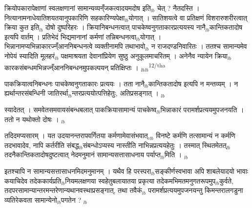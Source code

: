 \documentclass[article,12pt,a4paper]{memoir}%
\newcounter{parCount}
\begin{document}
	  \pstart \leavevmode%
	क्रियोपकारापेक्षाणां स्वलक्षणानां सामान्यव्यन्ँजकत्वादयमदोष इति{\tiny $_{lb}$} चेत् ? नैतदस्ति । नित्यानामनाधेयातिशयतयानुपकारिणि सहकारिण्यपेक्षा{\tiny $_{lb}$}योगात् । सातिशयत्वे वा प्रतिक्षणं विशरारुशरीरत्वात् क्रिया कुत इति{\tiny $_{lb}$} दोषो दुष्परिहरः । क्रियानिबन्धनत्वात् पाचकेष्वनुगताकारप्रत्ययस्य नानै{\tiny $_{lb}$}कान्तिकतादोष इत्यपि वार्तम् । प्रतिभेदं भिद्यमानानां कर्मणां तन्निबन्धनत्वा{\tiny $_{lb}$}योगात् । भिन्नानामप्यभिन्नाकारज्न्ँआननिबन्धनत्वे व्यक्तीनामपि तथाभावो{\tiny $_{lb}$} न राजदण्डनिवारितः । ततश्च सामान्यमेव नोपेयं स्यादिति मूलहरं{\tiny $_{lb}$} पक्षमाश्रयता देवानांप्रियेण सुष्ठु अनुकूलमाचरितम् । अनेनैव न्यायेन क्रिया{\tiny $_{lb}$}कारकसंबन्धमभिन्नज्न्ँआननिबन्धनमुपकल्पयन् प्रतिक्षिप्तः ।
	{}
	\pend%
      {\tiny $_{lb}$}{\tiny $_{lb}$}\textsuperscript{\textenglish{12/tha}}

	  \pstart \leavevmode%
	पाकक्रियात्वनिबन्धनः पाचकेष्वनुगताकारः प्रत्ययः । तता नानै{\tiny $_{lb}$}कान्तिकतादोष इत्यपि न मन्तव्यम् । न ह्यर्थान्तरसंबन्धिनी जातिरर्था{\tiny $_{lb}$}न्तरप्रत्ययोत्पत्तिहेतुः, अतिप्रसङ्गात् ।
	{}
	\pend%
      {\tiny $_{lb}$}

	  \pstart \leavevmode%
	स्यादेतत् । समवेतसमवायसंबन्धबलात् पाकक्रियासामान्यं पाचकेष्व{\tiny $_{lb}$}भिन्नाकारं परामर्शप्रत्ययमुपजनयति । ततो न यथोक्तो दोषः ।
	{}
	\pend%
      {\tiny $_{lb}$}

	  \pstart \leavevmode%
	तदिदमप्यसारम् । यत उदयानन्तरापवर्गितया कर्मणामेवासंभवात्,{\tiny $_{lb}$} विनष्टे कर्मणि तत्सामान्यं न कर्मणि तदभावादेव, नापि कर्तरीति संबद्ध{\tiny $_{lb}$}संबन्धोऽप्यस्य नास्तीति नाभिन्नप्रत्ययहेतुः । तस्मात् स्थितमेतत्{\tiny $_{lb}$} तदनैकान्तिकतादोषदुष्टत्वात् नेदमनुमानं सामान्यसत्तासाधनाय पर्याप्त{\tiny $_{lb}$}मिति ।
	{}
	\pend%
      {\tiny $_{lb}$}

	  \pstart \leavevmode%
	इतश्चापि न सामान्यसत्तासाधनमिदमनुमानम् । यथैव हि परस्परा{\tiny $_{lb}$}सङ्कीर्णस्वभावा अपि शाबलेयादयो भावाः कयाचिदेव तदेककार्यप्रति{\tiny $_{lb}$}नियमलक्षणया स्वहेतुबलायातया प्रकृत्या तदेकमभिमतमनुगतरूपमुप{\tiny $_{lb}$}कुर्वते, तदपरसामान्यान्तरमन्तरेणान्यथानवस्थाप्रसङ्गात्, तथा तवैकं{\tiny $_{lb}$} परामर्शप्रत्ययमुपजनयन्तु किमन्तरालगडुना व्यतिरेकवता सामान्येनो{\tiny $_{lb}$}पगतेन ?
	{}
	\pend%
      {\tiny $_{lb}$}
\end{document}
